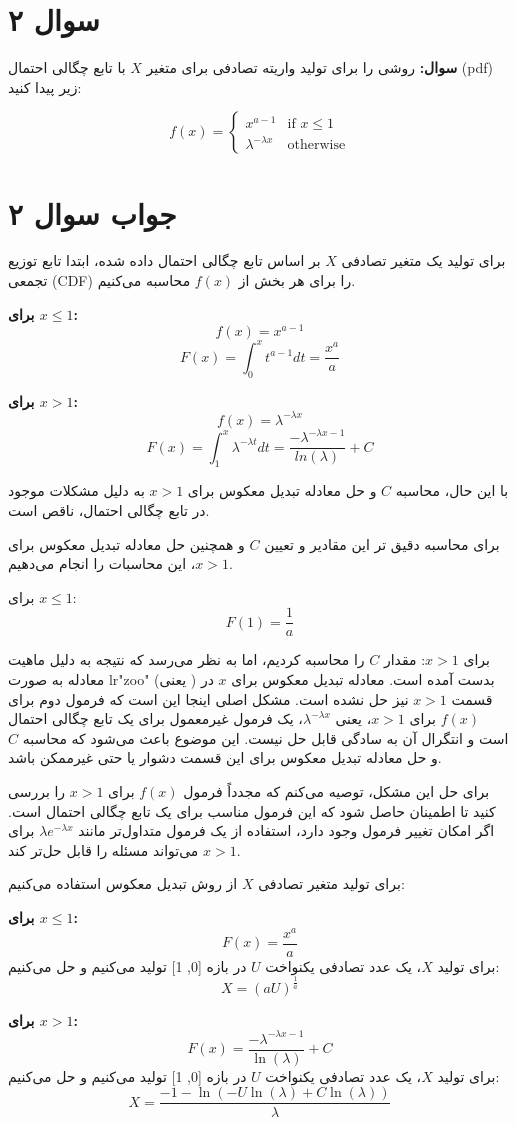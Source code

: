 \section*{سوال ۲}

\textbf{سوال:} روشی را برای تولید واریته تصادفی برای متغیر \( X \) با تابع چگالی احتمال (pdf) زیر پیدا کنید:

\[
f(x) = 
\begin{cases} 
	x^{a-1} & \text{if } x \leq 1 \\
	\lambda^{-\lambda x} & \text{otherwise}
\end{cases}
\]

\section*{جواب سوال ۲}

برای تولید یک متغیر تصادفی \( X \) بر اساس تابع چگالی احتمال داده شده، ابتدا تابع توزیع تجمعی (CDF) را برای هر بخش از \( f(x) \) محاسبه می‌کنیم.

\textbf{برای \( x \leq 1 \):}
\[ f(x) = x^{a-1} \]
\[ F(x) = \int_{0}^{x} t^{a-1} dt = \frac{x^a}{a} \]

\textbf{برای \( x > 1 \):}
\[ f(x) = \lambda^{-\lambda x} \]
\[ F(x) = \int_{1}^{x} \lambda^{-\lambda t} dt = \frac{-\lambda^{-\lambda x-1}}{ln(\lambda)} + C \]

با این حال، محاسبه \( C \) و حل معادله تبدیل معکوس برای \( x > 1 \) به دلیل مشکلات موجود در تابع چگالی احتمال، ناقص است.

برای محاسبه دقیق تر این مقادیر و تعیین \( C \) و همچنین حل معادله تبدیل معکوس برای \( x > 1 \)، این محاسبات را انجام می‌دهیم.

برای \( x \leq 1 \):
\[ F(1) = \frac{1}{a} \]

برای \( x > 1 \):
مقدار \( C \) را محاسبه کردیم، اما به نظر می‌رسد که نتیجه به دلیل ماهیت معادله به صورت 
lr{"zoo"}
(یعنی  ) بدست آمده است.
معادله تبدیل معکوس برای \( x \) در قسمت \( x > 1 \) نیز حل نشده است.
مشکل اصلی اینجا این است که فرمول دوم برای \( f(x) \) برای \( x > 1 \)، یعنی \( \lambda^{-\lambda x} \)، یک فرمول غیرمعمول برای یک تابع چگالی احتمال است و انتگرال آن به سادگی قابل حل نیست. این موضوع باعث می‌شود که محاسبه \( C \) و حل معادله تبدیل معکوس برای این قسمت دشوار یا حتی غیرممکن باشد.

برای حل این مشکل، توصیه می‌کنم که مجدداً فرمول \( f(x) \) برای \( x > 1 \) را بررسی کنید تا اطمینان حاصل شود که این فرمول مناسب برای یک تابع چگالی احتمال است. اگر امکان تغییر فرمول وجود دارد، استفاده از یک فرمول متداول‌تر مانند \( \lambda e^{-\lambda x} \) برای \( x > 1 \) می‌تواند مسئله را قابل حل‌تر کند.

برای تولید متغیر تصادفی \( X \) از روش تبدیل معکوس استفاده می‌کنیم:

\textbf{برای \( x \leq 1 \):}
\[ F(x) = \frac{x^a}{a} \]
برای تولید \( X \)، یک عدد تصادفی یکنواخت \( U \) در بازه [0, 1] تولید می‌کنیم و حل می‌کنیم:
\[ X = (aU)^{\frac{1}{a}} \]

\textbf{برای \( x > 1 \):}
\[ F(x) = \frac{-\lambda^{-\lambda x-1}}{\ln(\lambda)} + C \]
برای تولید \( X \)، یک عدد تصادفی یکنواخت \( U \) در بازه [0, 1] تولید می‌کنیم و حل می‌کنیم:
\[ X = \frac{-1 - \ln(-U \ln(\lambda) + C \ln(\lambda))}{\lambda} \]
